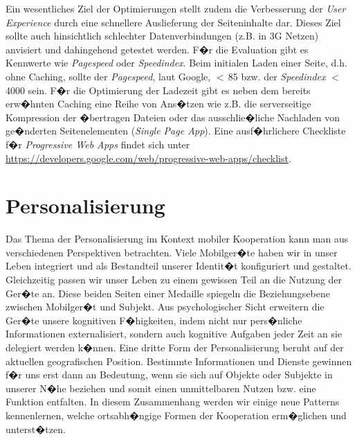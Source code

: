 Ein wesentliches Ziel der Optimierungen stellt zudem die Verbesserung der \textit{User Experience} durch eine schnellere Auslieferung der Seiteninhalte dar. Dieses Ziel sollte auch hinsichtlich schlechter Datenverbindungen (z.B. in 3G Netzen) anvisiert und dahingehend getestet werden. F�r die Evaluation gibt es Kennwerte wie \textit{Pagespeed} oder \textit{Speedindex}. Beim initialen Laden einer Seite, d.h. ohne Caching, sollte der \textit{Pagespeed}, laut Google, $<$\,85 bzw. der \textit{Speedindex} $<$\, 4000 sein. F�r die Optimierung der Ladezeit gibt es neben dem bereits erw�hnten Caching eine Reihe von Ans�tzen wie z.B. die serverseitige Kompression der �bertragen Dateien oder das ausschlie�liche Nachladen von ge�nderten Seitenelementen (\textit{Single Page App}). Eine ausf�hrlichere Checkliste f�r \textit{Progressive Web Apps} findet sich unter \url{https://developers.google.com/web/progressive-web-apps/checklist}.  


\section{Personalisierung}
Das Thema der Personalisierung im Kontext mobiler Kooperation kann man aus verschiedenen Perspektiven betrachten. 
Viele Mobilger�te haben wir in unser Leben integriert und als Bestandteil unserer Identit�t konfiguriert und gestaltet. Gleichzeitig passen wir unser Leben zu einem gewissen Teil an die Nutzung der Ger�te an. Diese beiden Seiten einer Medaille spiegeln die Beziehungsebene zwischen Mobilger�t und Subjekt. 
Aus psychologischer Sicht erweitern die Ger�te unsere kognitiven F�higkeiten, indem nicht nur pers�nliche Informationen externalisiert, sondern auch kognitive Aufgaben jeder Zeit an sie delegiert werden k�nnen. 
Eine dritte Form der Personalisierung beruht auf der aktuellen geografischen Position. Bestimmte Informationen und Dienste gewinnen f�r uns erst dann an Bedeutung, wenn sie sich auf Objekte oder Subjekte in unserer N�he beziehen und somit einen unmittelbaren Nutzen bzw. eine Funktion entfalten. 
In diesem Zusammenhang werden wir einige neue Patterns kennenlernen, welche ortsabh�ngige Formen der Kooperation erm�glichen und unterst�tzen. 

